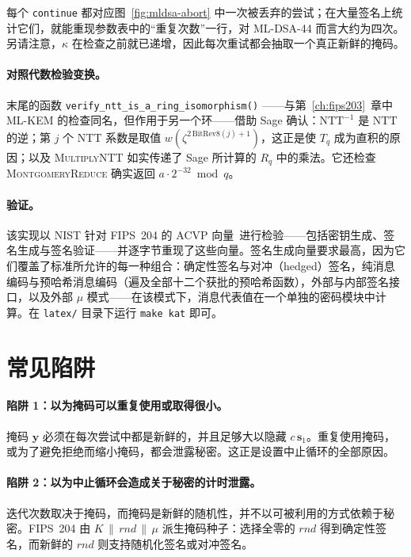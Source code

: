 每个 \texttt{continue} 都对应图~\ref{fig:mldsa-abort} 中一次被丢弃的尝试；在大量签名上统计它们，就能重现参数表中的“重复次数”一行，对 ML-DSA-44 而言大约为四次。另请注意，$\kappa$ 在检查之前就已递增，因此每次重试都会抽取一个真正新鲜的掩码。

\paragraph{对照代数检验变换。}
 末尾的函数 \texttt{verify\_ntt\_is\_a\_ring\_isomorphism()}
——与第~\ref{ch:fips203}~章中 ML-KEM 的检查同名，但作用于另一个环——借助 Sage
确认：$\mathrm{NTT}^{-1}$ 是 $\mathrm{NTT}$ 的逆；第 $j$ 个 NTT
系数是取值 $w(\zeta^{2\,\mathrm{BitRev8}(j)+1})$，这正是使 $T_q$ 成为直积的原因；以及 \textsc{MultiplyNTT} 如实传递了 Sage 所计算的
$R_q$ 中的乘法。它还检查
\textsc{MontgomeryReduce} 确实返回 $a\cdot 2^{-32} \bmod q$。

\paragraph{验证。}
该实现以 NIST 针对 FIPS~204 的 ACVP 向量~\cite{acvp}进行检验——包括密钥生成、签名生成与签名验证——并逐字节重现了这些向量。签名生成向量要求最高，因为它们覆盖了标准所允许的每一种组合：确定性签名与对冲（hedged）签名，纯消息编码与预哈希消息编码（遍及全部十二个获批的预哈希函数），外部与内部签名接口，以及外部 $\mu$ 模式——在该模式下，消息代表值在一个单独的密码模块中计算。在
\texttt{latex/} 目录下运行 \texttt{make kat} 即可。

\section{常见陷阱}

\paragraph{陷阱 1：以为掩码可以重复使用或取得很小。}
掩码 $\mathbf{y}$ 必须在每次尝试中都是新鲜的，并且足够大以隐藏 $c\,\mathbf{s}_1$。重复使用掩码，或为了避免拒绝而缩小掩码，都会泄露秘密。这正是设置中止循环的全部原因。

\paragraph{陷阱 2：以为中止循环会造成关于秘密的计时泄露。}
迭代次数取决于掩码，而掩码是新鲜的随机性，并不以可被利用的方式依赖于秘密。FIPS~204 由 $K\,\|\,rnd\,\|\,\mu$ 派生掩码种子：选择全零的 $rnd$ 得到确定性签名，而新鲜的 $rnd$ 则支持随机化签名或对冲签名。

